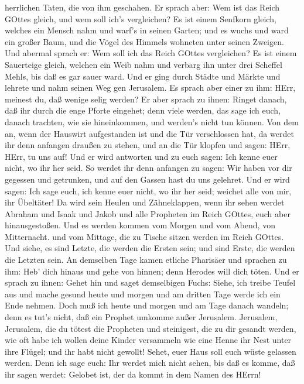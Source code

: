 herrlichen Taten, die von ihm geschahen.  Er sprach aber:
Wem ist das Reich GOttes gleich, und wem soll ich's vergleichen?
 Es ist einem Senfkorn gleich, welches ein Mensch nahm und
warf's in seinen Garten; und es wuchs und ward ein großer Baum, und die
Vögel des Himmels wohneten unter seinen Zweigen.  Und
abermal sprach er: Wem soll ich das Reich GOttes vergleichen?
 Es ist einem Sauerteige gleich, welchen ein Weib nahm und
verbarg ihn unter drei Scheffel Mehls, bis daß es gar sauer ward.
 Und er ging durch Städte und Märkte und lehrete und nahm
seinen Weg gen Jerusalem.  Es sprach aber einer zu ihm:
HErr, meinest du, daß wenige selig werden? Er aber sprach zu ihnen:
 Ringet danach, daß ihr durch die enge Pforte eingehet;
denn viele werden, das sage ich euch, danach trachten, wie sie
hineinkommen, und werden's nicht tun können.  Von dem an,
wenn der Hauswirt aufgestanden ist und die Tür verschlossen hat, da
werdet ihr denn anfangen draußen zu stehen, und an die Tür klopfen und
sagen: HErr, HErr, tu uns auf! Und er wird antworten und zu euch sagen:
Ich kenne euer nicht, wo ihr her seid.  So werdet ihr denn
anfangen zu sagen: Wir haben vor dir gegessen und getrunken, und auf den
Gassen hast du uns gelehret.  Und er wird sagen: Ich sage
euch, ich kenne euer nicht, wo ihr her seid; weichet alle von mir, ihr
Übeltäter!  Da wird sein Heulen und Zähneklappen, wenn ihr
sehen werdet Abraham und Isaak und Jakob und alle Propheten im Reich
GOttes, euch aber hinausgestoßen.  Und es werden kommen vom
Morgen und vom Abend, von Mitternacht. und vom Mittage, die zu Tische
sitzen werden im Reich GOttes.  Und siehe, es sind Letzte,
die werden die Ersten sein; und sind Erste, die werden die Letzten sein.
 An demselben Tage kamen etliche Pharisäer und sprachen zu
ihm: Heb' dich hinaus und gehe von hinnen; denn Herodes will dich töten.
 Und er sprach zu ihnen: Gehet hin und saget demselbigen
Fuchs: Siehe, ich treibe Teufel aus und mache gesund heute und morgen
und am dritten Tage werde ich ein Ende nehmen.  Doch muß
ich heute und morgen und am Tage danach wandeln; denn es tut's nicht,
daß ein Prophet umkomme außer Jerusalem.  Jerusalem,
Jerusalem, die du tötest die Propheten und steinigest, die zu dir
gesandt werden, wie oft habe ich wollen deine Kinder versammeln wie eine
Henne ihr Nest unter ihre Flügel; und ihr habt nicht gewollt!
 Sehet, euer Haus soll euch wüste gelassen werden. Denn ich
sage euch: Ihr werdet mich nicht sehen, bis daß es komme, daß ihr sagen
werdet: Gelobet ist, der da kommt in dem Namen des HErrn!

